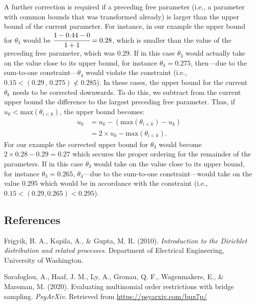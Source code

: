 \begin{appendix}
A further correction is required if a preceding free parameter (i.e., a
parameter with common bounds that was transformed already) is larger
than the upper bound of the current parameter. For instance, in our
example the upper bound for \(\theta_3\) would be
\(\cfrac{1 - 0.44 - 0}{1 + 1} = 0.28\), which is smaller than the value
of the preceding free parameter, which was \(0.29\). If in this case
\(\theta_3\) would actually take on the value close to its upper bound,
for instance \(\theta_3 = 0.275\), then---due to the sum-to-one
constraint---\(\theta_4\) would violate the constraint (i.e.,
\(0.15 < (0.29\, , \, 0.275) \nless 0.285\)). In these cases, the upper
bound for the current \(\theta_k\) needs to be corrected downwards. To
do this, we subtract from the current upper bound the difference to the
largest preceding free parameter. Thus, if
\(u_k < \text{max}(\theta_{i < k})\), the upper bound becomes:
\begin{align}
u_k &= u_k - (\text{max}(\theta_{i < k}) - u_k) \\
&= 2 \times u_k - \text{max}(\theta_{i < k}).
\end{align} For our example the corrected upper bound for \(\theta_3\)
would become \(2 \times 0.28 - 0.29 = 0.27\) which secures the proper
ordering for the remainder of the parameters. If in this case
\(\theta_3\) would take on the value close to its upper bound, for
instance \(\theta_3 = 0.265\), \(\theta_4\)---due to the sum-to-one
constraint---would take on the value \(0.295\) which would be in
accordance with the constraint (i.e., \(0.15 < (0.29, 0.265) < 0.295\)).

\clearpage

\hypertarget{references}{%
\subsection{References}\label{references}}

\begingroup
\setlength{\parindent}{-0.5in}
\setlength{\leftskip}{0.5in}

\hypertarget{refs}{}
\leavevmode\hypertarget{ref-frigyik2010introduction}{}%
Frigyik, B. A., Kapila, A., \& Gupta, M. R. (2010). \emph{Introduction
to the Dirichlet distribution and related processes}. Department of
Electrical Engineering, University of Washington.

\leavevmode\hypertarget{ref-sarafoglou2020evaluatingPreprint}{}%
Sarafoglou, A., Haaf, J. M., Ly, A., Gronau, Q. F., Wagenmakers, E., \&
Marsman, M. (2020). Evaluating multinomial order restrictions with
bridge sampling. \emph{PsyArXiv}. Retrieved from
\url{https://psyarxiv.com/bux7p/}

\endgroup
\end{appendix}

